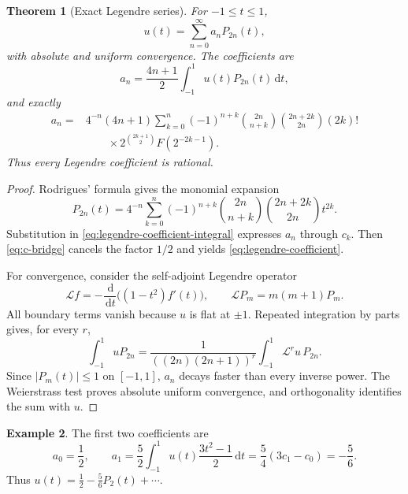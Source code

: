 \documentclass[11pt]{article}
\newtheorem{theorem}{Theorem}[section]
\theoremstyle{definition}
\newtheorem{example}[theorem]{Example}
\theoremstyle{remark}
\newcommand{\dd}{\,\mathrm d}\newcommand{\e}{\mathrm e}\newcommand{\ii}{\mathrm i}
\begin{document}
\begin{theorem}[Exact Legendre series]\label{thm:legendre}
For $-1\le t\le1$,
\begin{equation}\label{eq:legendre-series}
 u(t)=\sum_{n=0}^{\infty}a_nP_{2n}(t),
\end{equation}
with absolute and uniform convergence.  The coefficients are
\begin{equation}\label{eq:legendre-coefficient-integral}
 a_n=\frac{4n+1}{2}\int_{-1}^{1}u(t)P_{2n}(t)\dd t,
\end{equation}
and exactly
\begin{equation}\label{eq:legendre-coefficient}
\boxed{\begin{aligned}
 a_n={}&4^{-n}(4n+1)\sum_{k=0}^{n}(-1)^{n+k}
 \binom{2n}{n+k}\binom{2n+2k}{2n}(2k)!\\
 &\qquad\times2^{\binom{2k+1}{2}}F(2^{-2k-1}).
\end{aligned}}
\end{equation}
Thus every Legendre coefficient is rational.
\end{theorem}
\begin{proof}
Rodrigues' formula gives the monomial expansion
\begin{equation}\label{eq:legendre-monomial}
 P_{2n}(t)=4^{-n}\sum_{k=0}^{n}(-1)^{n+k}
 \binom{2n}{n+k}\binom{2n+2k}{2n}t^{2k}.
\end{equation}
Substitution in \eqref{eq:legendre-coefficient-integral} expresses $a_n$ through $c_k$.  Then \eqref{eq:c-bridge} cancels the factor $1/2$ and yields \eqref{eq:legendre-coefficient}.

For convergence, consider the self-adjoint Legendre operator
\[
 \mathcal Lf=-\frac{\dd}{\dd t}\bigl((1-t^2)f'(t)\bigr),
 \qquad \mathcal LP_m=m(m+1)P_m.
\]
All boundary terms vanish because $u$ is flat at $\pm1$.  Repeated integration by parts gives, for every $r$,
\[
 \int_{-1}^{1}uP_{2n}
 =\frac1{((2n)(2n+1))^r}\int_{-1}^{1}\mathcal L^ru\,P_{2n}.
\]
Since $|P_m(t)|\le1$ on $[-1,1]$, $a_n$ decays faster than every inverse power.  The Weierstrass test proves absolute uniform convergence, and orthogonality identifies the sum with $u$.
\end{proof}

\begin{example}
The first two coefficients are
\[
 a_0=\frac12,
 \qquad
 a_1=\frac52\int_{-1}^{1}u(t)\frac{3t^2-1}{2}\dd t
 =\frac54(3c_1-c_0)=-\frac56.
\]
Thus $u(t)=\frac12-\frac56P_2(t)+\cdots$.
\end{example}
\end{document}
